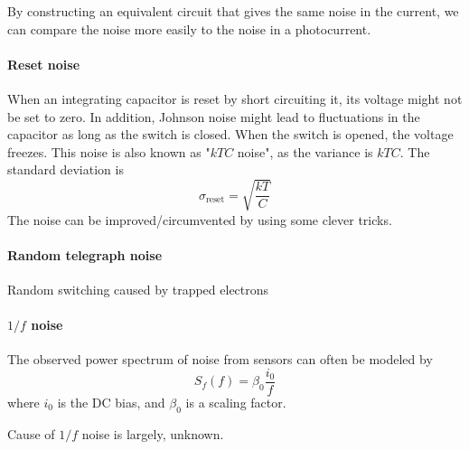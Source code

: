 \documentclass[article]{memoir}
\begin{document}
By constructing an equivalent circuit that gives the same noise in the current, we can compare the noise more easily to the noise in a photocurrent.

\paragraph{Reset noise}
When an integrating capacitor is reset by short circuiting it, its voltage might not be set to zero. In addition, Johnson noise might lead to fluctuations in the capacitor as long as the switch is closed. When the switch is opened, the voltage freezes. This noise is also known as "\(kTC\) noise", as the variance is \(kTC\). The standard deviation is
\[
    \sigma_{\text{reset}} = \sqrt{\frac{kT}{C}}
\]
The noise can be improved/circumvented by using some clever tricks.

\paragraph{Random telegraph noise}
Random switching caused by trapped electrons

\paragraph{\(1/f\) noise}
The observed power spectrum of noise from sensors can often be modeled by
\[
    S_f(f) = \beta_0 \frac{i_0}{f}
\]
where \(i_0\) is the DC bias, and \(\beta_0\) is a scaling factor.

Cause of \(1/f\) noise is largely, unknown. 
\end{document}
